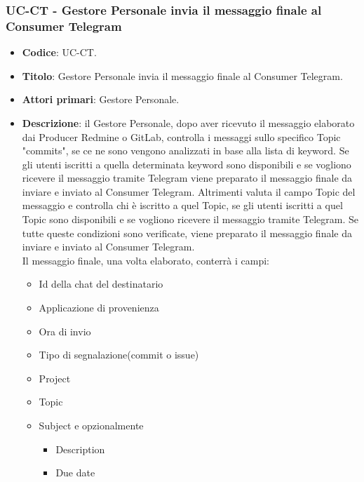 \subsubsection{UC\theuccount-CT - Gestore Personale invia il messaggio finale al Consumer Telegram}
	\begin{itemize}
		\item \textbf{Codice}: UC\theuccount-CT.
		\item \textbf{Titolo}: Gestore Personale invia il messaggio finale al Consumer Telegram.
		\item \textbf{Attori primari}: Gestore Personale.
		\item \textbf{Descrizione}: il Gestore Personale, dopo aver ricevuto il messaggio elaborato
		dai Producer Redmine o GitLab, controlla i messaggi sullo specifico Topic "commits", se ce ne
		sono vengono analizzati in base alla	lista di keyword. Se gli utenti iscritti a quella determinata
		keyword sono disponibili e se vogliono ricevere il messaggio tramite Telegram viene preparato
		il messaggio finale da inviare e inviato al Consumer Telegram. Altrimenti valuta il campo Topic del
		messaggio e controlla chi è iscritto a quel Topic, se gli utenti iscritti a quel Topic sono disponibili e
		se vogliono ricevere il messaggio tramite Telegram. Se tutte queste condizioni sono verificate, viene preparato
		il messaggio finale da inviare e inviato al Consumer Telegram.\\
		Il messaggio finale, una volta elaborato, conterrà i campi:
		\begin{itemize}
			\item Id della chat del destinatario
			\item Applicazione di provenienza
			\item Ora di invio
			\item Tipo di segnalazione(commit o issue)
			\item Project
			\item Topic
			\item Subject e opzionalmente
		 	\begin{itemize}
				\item Description
				\item Due date

\end{itemize}
\end{itemize}
\end{itemize}

